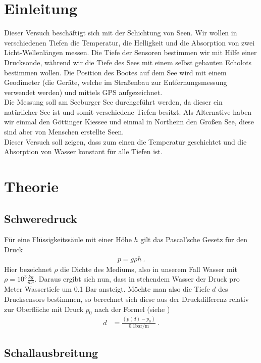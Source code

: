 \documentclass[12pt,a4paper,titlepage,headinclude,bibtotoc]{scrartcl}
\numberwithin{equation}{subsection}
\begin{document}
\setcounter{footnote}{0}
\setcounter{page}{1}

\section{Einleitung}
\label{sec:einleitung}
Dieser Versuch beschäftigt sich mit der Schichtung von Seen.
Wir wollen in verschiedenen Tiefen die Temperatur, die Helligkeit und die Absorption von zwei Licht-Wellenlängen messen.
Die Tiefe der Sensoren bestimmen wir mit Hilfe einer Drucksonde, während wir die Tiefe des Sees mit einem selbst gebauten Echolots bestimmen wollen.
Die Position des Bootes auf dem See wird mit einem Geodimeter (die Geräte, welche im Straßenbau zur Entfernungsmessung verwendet werden) und mittels GPS aufgezeichnet.\\
Die Messung soll am Seeburger See durchgeführt werden, da dieser ein natürlicher See ist und somit verschiedene Tiefen besitzt.
Als Alternative haben wir einmal den Göttinger Kiessee und einmal in Northeim den Großen See, diese sind aber von Menschen erstellte Seen.\\
Dieser Versuch soll zeigen, dass zum einen die Temperatur geschichtet und die Absorption von Wasser konstant für alle Tiefen ist.


\section{Theorie}
\label{sec:theorie}
\subsection{Schweredruck}

Für eine Flüssigkeitssäule mit einer Höhe $h$ gilt das Pascal'sche Gesetz für den Druck
\begin{align}
 p= g \rho h~.
\end{align}
Hier bezeichnet $\rho$ die Dichte des Mediums, also in unserem Fall Wasser mit $\rho = 10^3 \frac{kg}{m^3}$. Daraus ergibt sich nun, dass in stehendem Wasser der Druck pro Meter Wassertiefe um 0.1 Bar ansteigt.
Möchte man also die Tiefe $d$ des Drucksensors bestimmen, so berechnet sich diese aus der Druckdifferenz relativ zur Oberfläche mit Druck $p_0$ nach der Formel (siehe \cite[S.118]{gerthsen})
\begin{align}
	d&=\frac{(p(d)-p_0)}{0.1\si{\bar \per\metre}}~. \label{eq:d}
\end{align}

\subsection{Schallausbreitung}
\end{document}
